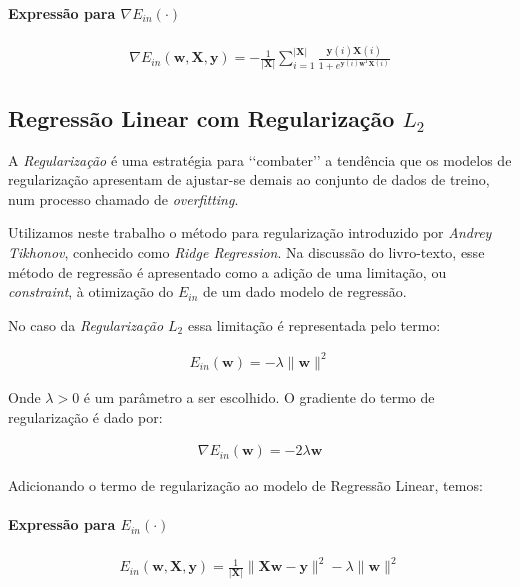 \documentclass[a4paper, 12pt]{article}
\begin{document}
\paragraph{Expressão para $\nabla{}E_{in}(\cdot)$}

\begin{align*}
    \nabla{}E_{in}(\textbf{w}, \textbf{X}, \textbf{y}) = -\frac{1}{|\textbf{X}|} \sum^{|\textbf{X}|}_{i=1}{\frac{\textbf{y}(i)\textbf{X}(i)}{1 + e^{\textbf{y}(i)\textbf{w}^{T}\textbf{X}(i)}}}
\end{align*}

\subsection{Regressão Linear com Regularização $L_2$}

A \textit{Regularização} é uma estratégia para \lq\lq{}combater\rq\rq{} a
tendência que os modelos de regularização apresentam de ajustar-se demais ao
conjunto de dados de treino, num processo chamado de \textit{overfitting}.

Utilizamos neste trabalho o método para regularização introduzido por
\textit{Andrey Tikhonov}, conhecido como \textit{Ridge Regression}.
Na discussão do livro-texto, esse método de regressão é apresentado
como a adição de uma limitação, ou \textit{constraint}, à otimização
do $E_{in}$ de um dado modelo de regressão.

No caso da \textit{Regularização $L_2$} essa limitação é representada pelo termo:

\begin{align*}
    E_{in}(\textbf{w}) = -\lambda\|\textbf{w}\|^{2}
\end{align*}

Onde $\lambda > 0$ é um parâmetro a ser escolhido. O gradiente do termo
de regularização é dado por:

\begin{align*}
    \nabla{}E_{in}(\textbf{w}) = -2\lambda{}\textbf{w}
\end{align*}

Adicionando o termo de regularização ao modelo de Regressão Linear, temos:

\paragraph{Expressão para $E_{in}(\cdot)$}

\begin{align*}
    E_{in}(\textbf{w}, \textbf{X}, \textbf{y}) = \frac{1}{|\textbf{X}|} \|\textbf{Xw} - \textbf{y}\|^{2} - \lambda\|\textbf{w}\|^{2}
\end{align*}
\end{document}
